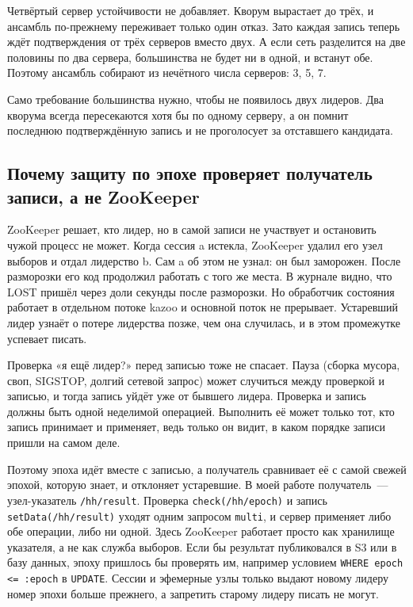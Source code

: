 \documentclass[11pt,a4paper]{article}
\begin{document}
Четвёртый сервер устойчивости не добавляет. Кворум вырастает до трёх, и ансамбль по-прежнему переживает только один отказ. Зато каждая запись теперь ждёт подтверждения от трёх серверов вместо двух. А если сеть разделится на две половины по два сервера, большинства не будет ни в одной, и встанут обе. Поэтому ансамбль собирают из нечётного числа серверов: 3, 5, 7.

Само требование большинства нужно, чтобы не появилось двух лидеров. Два кворума всегда пересекаются хотя бы по одному серверу, а он помнит последнюю подтверждённую запись и не проголосует за отставшего кандидата.

\subsection{Почему защиту по эпохе проверяет получатель записи, а не ZooKeeper}

ZooKeeper решает, кто лидер, но в самой записи не участвует и остановить чужой процесс не может. Когда сессия a истекла, ZooKeeper удалил его узел выборов и отдал лидерство b. Сам a об этом не узнал: он был заморожен. После разморозки его код продолжил работать с того же места. В журнале видно, что LOST пришёл через доли секунды после разморозки. Но обработчик состояния работает в отдельном потоке kazoo и основной поток не прерывает. Устаревший лидер узнаёт о потере лидерства позже, чем она случилась, и в этом промежутке успевает писать.

Проверка «я ещё лидер?» перед записью тоже не спасает. Пауза (сборка мусора, своп, SIGSTOP, долгий сетевой запрос) может случиться между проверкой и записью, и тогда запись уйдёт уже от бывшего лидера. Проверка и запись должны быть одной неделимой операцией. Выполнить её может только тот, кто запись принимает и применяет, ведь только он видит, в каком порядке записи пришли на самом деле.

Поэтому эпоха идёт вместе с записью, а получатель сравнивает её с самой свежей эпохой, которую знает, и отклоняет устаревшие. В моей работе получатель~--- узел-указатель \texttt{/hh/result}. Проверка \texttt{check(/hh/epoch)} и запись \texttt{setData(/hh/result)} уходят одним запросом \texttt{multi}, и сервер применяет либо обе операции, либо ни одной. Здесь ZooKeeper работает просто как хранилище указателя, а не как служба выборов. Если бы результат публиковался в S3 или в базу данных, эпоху пришлось бы проверять им, например условием \texttt{WHERE epoch <= :epoch} в \texttt{UPDATE}. Сессии и эфемерные узлы только выдают новому лидеру номер эпохи больше прежнего, а запретить старому лидеру писать не могут.
\end{document}
